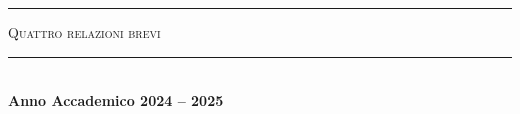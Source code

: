 \begin{titlingpage}
\begin{center}
        \vfill
        \centering
        \begin{minipage}[h]{\unictsize}
            \centering
            \hrule
            \vspace{10pt}
            \textsc{Quattro relazioni brevi}
            \vspace{10pt}
            \hrule
        \end{minipage}
        \\[50pt]
        \vspace{\fill}
        \vspace{30pt}
        \doublerule
        \vspace{10pt}
        \normalsize
        \textbf{Anno Accademico 2024 -- 2025}
    \end{center}
\end{titlingpage}
\restoregeometry
